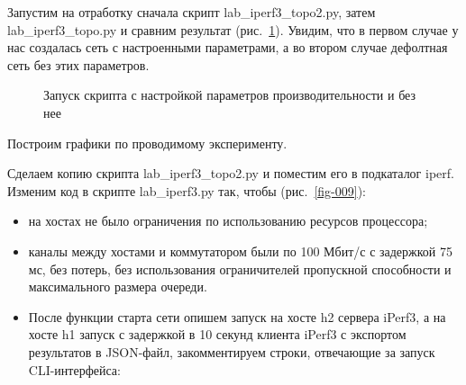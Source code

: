 \documentclass[
  english,
  russian,
  12pt,
  a4paper,
  DIV=11,
  numbers=noendperiod]{scrreprt}
\providecommand{\tightlist}{%
  \setlength{\itemsep}{0pt}\setlength{\parskip}{0pt}}
\begin{document}
Запустим на отработку сначала скрипт lab\_iperf3\_topo2.py, затем
lab\_iperf3\_topo.py и сравним результат (рис.~\ref{fig-008}). Увидим,
что в первом случае у нас создалась сеть с настроенными параметрами, а
во втором случае дефолтная сеть без этих параметров.

\begin{figure}


\caption{\label{fig-008}Запуск скрипта с настройкой параметров
производительности и без нее}

\end{figure}%

Построим графики по проводимому эксперименту.

Сделаем копию скрипта lab\_iperf3\_topo2.py и поместим его в подкаталог
iperf. Изменим код в скрипте lab\_iperf3.py так, чтобы
(рис.~\ref{fig-009}):

\begin{itemize}
\tightlist
\item
  на хостах не было ограничения по использованию ресурсов процессора;
\item
  каналы между хостами и коммутатором были по 100 Мбит/с с задержкой 75
  мс, без потерь, без использования ограничителей пропускной способности
  и максимального размера очереди.
\item
  После функции старта сети опишем запуск на хосте h2 сервера iPerf3, а
  на хосте h1 запуск с задержкой в 10 секунд клиента iPerf3 с экспортом
  результатов в JSON-файл, закомментируем строки, отвечающие за запуск
  CLI-интерфейса:
\end{itemize}
\end{document}
